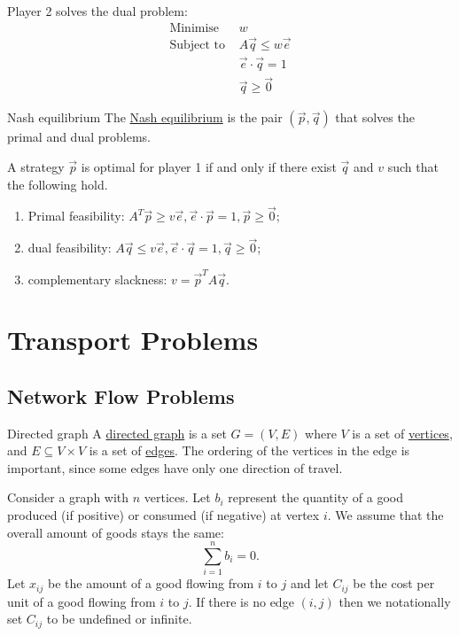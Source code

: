 \documentclass[../Main.tex]{subfiles}
\begin{document}
Player 2 solves the dual problem:
\begin{align*}
    \text{Minimise } &w \\
    \text{Subject to } & A \vec{q} \leq w\vec{e} \\
    & \vec{e} \cdot \vec{q} = 1 \\
    & \vec{q} \geq \vec{0}
\end{align*}
\begin{definition}{Nash equilibrium}
    The \underline{Nash equilibrium} is the pair $(\vec{p}, \vec{q})$ that solves the primal and dual problems.
\end{definition}
\begin{theorem}
    A strategy $\vec{p}$ is optimal for player 1 if and only if there exist $\vec{q}$ and $v$ such that the following hold.
    \begin{enumerate}
        \item Primal feasibility: $A^T\vec{p} \geq v\vec{e}, \vec{e} \cdot \vec{p} = 1, \vec{p} \geq \vec{0}$;
        \item dual feasibility: $A\vec{q} \leq v\vec{e}, \vec{e} \cdot \vec{q} = 1, \vec{q} \geq \vec0$;
        \item complementary slackness: $v = \vec{p}^TA\vec{q}$.
    \end{enumerate}
    \label{thmGameOptimality}
\end{theorem}
\section{Transport Problems}
\subsection{Network Flow Problems}
\begin{definition}{Directed graph}
    A \underline{directed graph} is a set $G = (V, E)$ where $V$ is a set of \underline{vertices}, and $E \subseteq V \times V$ is a set of \underline{edges}. The ordering of the vertices in the edge is important, since some edges have only one direction of travel.
\end{definition}
Consider a graph with $n$ vertices. Let $b_i$ represent the quantity of a good produced (if positive) or consumed (if negative) at vertex $i$. We assume that the overall amount of goods stays the same:
\begin{equation*}
    \sum_{i=1}^{n} b_i = 0.
\end{equation*}
Let $x_{ij}$ be the amount of a good flowing from $i$ to $j$ and let $C_{ij}$ be the cost per unit of a good flowing from $i$ to $j$. If there is no edge $(i, j)$ then we notationally set $C_{ij}$ to be undefined or infinite. 
\end{document}

